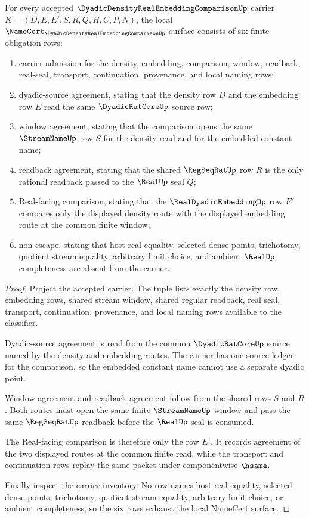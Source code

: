 \begin{theorem}
\label{thm:dyadic-density-real-embedding-comparison-namecert-obligations}
For every accepted $\DyadicDensityRealEmbeddingComparisonUp$ carrier
$K=(D,E,E',S,R,Q,H,C,P,N)$, the local
$\NameCert_{\DyadicDensityRealEmbeddingComparisonUp}$ surface consists of six
finite obligation rows:
\begin{enumerate}
\item carrier admission for the density, embedding, comparison, window,
readback, real-seal, transport, continuation, provenance, and local naming
rows;
\item dyadic-source agreement, stating that the density row $D$ and the
embedding row $E$ read the same $\DyadicRatCoreUp$ source row;
\item window agreement, stating that the comparison opens the same
$\StreamNameUp$ row $S$ for the density read and for the embedded constant
name;
\item readback agreement, stating that the shared $\RegSeqRatUp$ row $R$ is
the only rational readback passed to the $\RealUp$ seal $Q$;
\item Real-facing comparison, stating that the $\RealDyadicEmbeddingUp$ row
$E'$ compares only the displayed density route with the displayed embedding
route at the common finite window;
\item non-escape, stating that host real equality, selected dense points,
trichotomy, quotient stream equality, arbitrary limit choice, and ambient
$\RealUp$ completeness are absent from the carrier.
\end{enumerate}
\end{theorem}
\begin{proof}
Project the accepted carrier. The tuple lists exactly the density row,
embedding rows, shared stream window, shared regular readback, real seal,
transport, continuation, provenance, and local naming rows available to the
classifier.

Dyadic-source agreement is read from the common $\DyadicRatCoreUp$ source
named by the density and embedding routes. The carrier has one source ledger
for the comparison, so the embedded constant name cannot use a separate
dyadic point.

Window agreement and readback agreement follow from the shared rows $S$ and
$R$. Both routes must open the same finite $\StreamNameUp$ window and pass the
same $\RegSeqRatUp$ readback before the $\RealUp$ seal is consumed.

The Real-facing comparison is therefore only the row $E'$. It records
agreement of the two displayed routes at the common finite read, while the
transport and continuation rows replay the same packet under componentwise
$\hsame$.

Finally inspect the carrier inventory. No row names host real equality,
selected dense points, trichotomy, quotient stream equality, arbitrary limit
choice, or ambient completeness, so the six rows exhaust the local NameCert
surface.
\end{proof}

